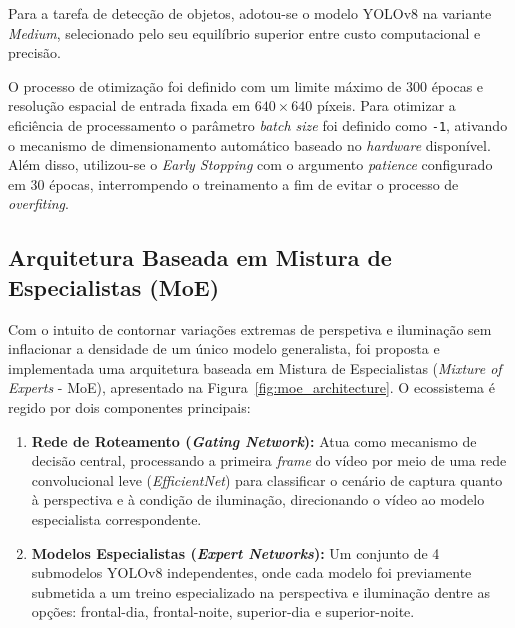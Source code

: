 \documentclass[12pt,fleqn]{article}
\begin{document}
Para a tarefa de detecção de objetos, adotou-se o modelo YOLOv8 na variante \textit{Medium}, selecionado pelo seu equilíbrio superior entre custo computacional e precisão. 

O processo de otimização foi definido com um limite máximo de 300 épocas e resolução espacial de entrada fixada em $640 \times 640$ píxeis. Para otimizar a eficiência de processamento o parâmetro \textit{batch size} foi definido como \texttt{-1}, ativando o mecanismo de dimensionamento automático baseado no \textit{hardware} disponível. Além disso, utilizou-se o \textit{Early Stopping} com o argumento \textit{patience} configurado em 30 épocas, interrompendo o treinamento a fim de evitar o processo de \textit{overfiting}.

\subsection{Arquitetura Baseada em Mistura de Especialistas (MoE)}

Com o intuito de contornar variações extremas de perspetiva e iluminação sem inflacionar a densidade de um único modelo generalista, foi proposta e implementada uma arquitetura baseada em Mistura de Especialistas (\textit{Mixture of Experts} - MoE), apresentado na Figura~\ref{fig:moe_architecture}. O ecossistema é regido por dois componentes principais:
\begin{enumerate}
    \item \textbf{Rede de Roteamento (\textit{Gating Network}):} Atua como mecanismo de decisão central, processando a primeira \textit{frame} do vídeo por meio de uma rede convolucional leve (\textit{EfficientNet}) para classificar o cenário de captura quanto à perspectiva e à condição de iluminação, direcionando o vídeo ao modelo especialista correspondente.
    \item \textbf{Modelos Especialistas (\textit{Expert Networks}):} Um conjunto de 4 submodelos YOLOv8 independentes, onde cada modelo foi previamente submetida a um treino especializado na perspectiva e iluminação dentre as opções: frontal-dia, frontal-noite, superior-dia e superior-noite.
\end{enumerate}
\end{document}
